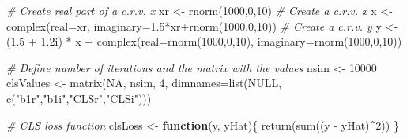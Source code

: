 \documentclass[
]{book}
\newenvironment{Shaded}{\begin{snugshade}}{\end{snugshade}}
\newcommand{\AttributeTok}[1]{\textcolor[rgb]{0.77,0.63,0.00}{#1}}
\newcommand{\CommentTok}[1]{\textcolor[rgb]{0.56,0.35,0.01}{\textit{#1}}}
\newcommand{\ConstantTok}[1]{\textcolor[rgb]{0.00,0.00,0.00}{#1}}
\newcommand{\ControlFlowTok}[1]{\textcolor[rgb]{0.13,0.29,0.53}{\textbf{#1}}}
\newcommand{\DecValTok}[1]{\textcolor[rgb]{0.00,0.00,0.81}{#1}}
\newcommand{\FloatTok}[1]{\textcolor[rgb]{0.00,0.00,0.81}{#1}}
\newcommand{\FunctionTok}[1]{\textcolor[rgb]{0.00,0.00,0.00}{#1}}
\newcommand{\NormalTok}[1]{#1}
\newcommand{\OtherTok}[1]{\textcolor[rgb]{0.56,0.35,0.01}{#1}}
\newcommand{\SpecialCharTok}[1]{\textcolor[rgb]{0.00,0.00,0.00}{#1}}
\newcommand{\StringTok}[1]{\textcolor[rgb]{0.31,0.60,0.02}{#1}}
\begin{document}
\begin{Shaded}
\begin{Highlighting}[]
\CommentTok{\# Create real part of a c.r.v. x}
\NormalTok{xr }\OtherTok{\textless{}{-}} \FunctionTok{rnorm}\NormalTok{(}\DecValTok{1000}\NormalTok{,}\DecValTok{0}\NormalTok{,}\DecValTok{10}\NormalTok{)}
\CommentTok{\# Create a c.r.v. x}
\NormalTok{x }\OtherTok{\textless{}{-}} \FunctionTok{complex}\NormalTok{(}\AttributeTok{real=}\NormalTok{xr, }\AttributeTok{imaginary=}\FloatTok{1.5}\SpecialCharTok{*}\NormalTok{xr}\SpecialCharTok{+}\FunctionTok{rnorm}\NormalTok{(}\DecValTok{1000}\NormalTok{,}\DecValTok{0}\NormalTok{,}\DecValTok{10}\NormalTok{))}
\CommentTok{\# Create a c.r.v. y}
\NormalTok{y }\OtherTok{\textless{}{-}}\NormalTok{ (}\FloatTok{1.5} \SpecialCharTok{+} \FloatTok{1.2}\NormalTok{i) }\SpecialCharTok{*}\NormalTok{ x }\SpecialCharTok{+}
    \FunctionTok{complex}\NormalTok{(}\AttributeTok{real=}\FunctionTok{rnorm}\NormalTok{(}\DecValTok{1000}\NormalTok{,}\DecValTok{0}\NormalTok{,}\DecValTok{10}\NormalTok{), }\AttributeTok{imaginary=}\FunctionTok{rnorm}\NormalTok{(}\DecValTok{1000}\NormalTok{,}\DecValTok{0}\NormalTok{,}\DecValTok{10}\NormalTok{))}

\CommentTok{\# Define number of iterations and the matrix with the values}
\NormalTok{nsim }\OtherTok{\textless{}{-}} \DecValTok{10000}
\NormalTok{clsValues }\OtherTok{\textless{}{-}} \FunctionTok{matrix}\NormalTok{(}\ConstantTok{NA}\NormalTok{, nsim, }\DecValTok{4}\NormalTok{,}
                    \AttributeTok{dimnames=}\FunctionTok{list}\NormalTok{(}\ConstantTok{NULL}\NormalTok{,}
                                  \FunctionTok{c}\NormalTok{(}\StringTok{"b1r"}\NormalTok{,}\StringTok{"b1i"}\NormalTok{,}\StringTok{"CLSr"}\NormalTok{,}\StringTok{"CLSi"}\NormalTok{)))}

\CommentTok{\# CLS loss function}
\NormalTok{clsLoss }\OtherTok{\textless{}{-}} \ControlFlowTok{function}\NormalTok{(y, yHat)\{}
    \FunctionTok{return}\NormalTok{(}\FunctionTok{sum}\NormalTok{((y }\SpecialCharTok{{-}}\NormalTok{ yHat)}\SpecialCharTok{\^{}}\DecValTok{2}\NormalTok{))}
\NormalTok{\}}


\end{Highlighting}
\end{Shaded}
\end{document}
